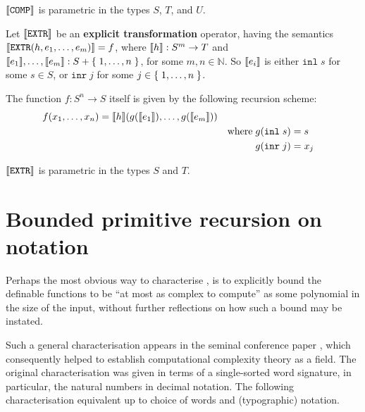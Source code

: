 \begin{remark} ${\mathopen{}\left\llbracket{\mathtt{COMP}}\right\rrbracket\mathclose{}}$ is parametric in the types $S$, $T$, and
$U$. \end{remark}

\begin{definition} \cite[p. 21]{smullyan-1961} Let ${\mathopen{}\left\llbracket{\mathtt{EXTR}}\right\rrbracket\mathclose{}}$ be an
\textbf{explicit transformation} operator, having the semantics
${\mathopen{}\left\llbracket{\mathtt{EXTR}{\ensuremath{\mathopen{}\left({h,e_1,\ldots,e_m}\right)\mathclose{}}}}\right\rrbracket\mathclose{}} = f$, where ${\mathopen{}\left\llbracket{h}\right\rrbracket\mathclose{}} : S^m \rightarrow
T$ and ${\mathopen{}\left\llbracket{e_1}\right\rrbracket\mathclose{}}, \ldots, {\mathopen{}\left\llbracket{e_m}\right\rrbracket\mathclose{}} : S + \mathopen{}\left\{\mathrel{}{1,\ldots,n}\mathrel{}\right\}\mathclose{}$, for some $m,n \in
\mathbb{N}$. So ${\mathopen{}\left\llbracket{e_i}\right\rrbracket\mathclose{}}$ is either $\mathtt{inl} \; s$ for some $s \in S$,
or $\mathtt{inr} \; j$ for some $j \in \mathopen{}\left\{\mathrel{}{1,\ldots, n}\mathrel{}\right\}\mathclose{}$.

The function $f : S^n \rightarrow S$ itself is given by the following recursion
scheme:\begin{alignat*}{3}
%
f\p{x_1,\ldots,x_n} &= \sem{h}\p{g\p{\sem{e_1}},\ldots,g\p{\sem{e_m}}} \\
%
& & \text{where} \; g\p{\mathtt{inl} \; s} &= s \\
%
& & g\p{\mathtt{inr} \; j} &= x_j
%
\end{alignat*}

\end{definition}

\begin{remark} ${\mathopen{}\left\llbracket{\mathtt{EXTR}}\right\rrbracket\mathclose{}}$ is parametric in the types $S$ and $T$.
\end{remark}

\section{Bounded primitive recursion on notation}

Perhaps the most obvious way to characterise \FPTIME{}, is to explicitly bound
the definable functions to be ``at most as complex to compute'' as some
polynomial in the size of the input, without further reflections on how such a
bound may be instated.

Such a general characterisation appears in the seminal conference paper
\cite{cobham-1965}, which consequently helped to establish computational
complexity theory as a field\cite{clote-1999}. The original characterisation
was given in terms of a single-sorted word signature, in particular, the
natural numbers in decimal notation. The following characterisation equivalent
up to choice of words and (typographic) notation. 

\def\smashf{\ensuremath{\mathtt{\#}}}
\def\cdotnot{\ensuremath{\cdot}}

